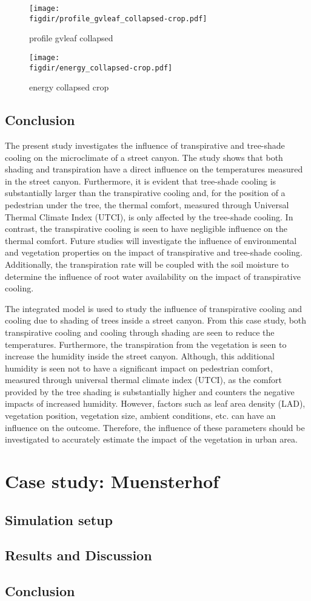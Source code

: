 \begin{figure}[p]
	\centering
	\texttt{[image: \\figdir/profile\_gvleaf\_collapsed-crop.pdf]}
	\caption{profile gvleaf collapsed}
	\label{fig:profile_gvleaf_collapsed}
\end{figure}

\begin{figure}[t]
	\centering
	\texttt{[image: \\figdir/energy\_collapsed-crop.pdf]}
	\caption{energy collapsed crop}
	\label{fig:energy_collapsed-crop}
\end{figure}


\subsection{Conclusion}

The present study investigates the influence of transpirative and tree-shade cooling on the microclimate of a street canyon. The study shows that both shading and transpiration have a direct influence on the temperatures measured in the street canyon. Furthermore, it is evident that tree-shade cooling is substantially larger than the transpirative cooling and, for the position of a pedestrian under the tree, the thermal comfort, measured through Universal Thermal Climate Index (UTCI), is only affected by the tree-shade cooling. In contrast, the transpirative cooling is seen to have negligible influence on the thermal comfort. Future studies will investigate the influence of environmental and vegetation properties on the impact of transpirative and tree-shade cooling. Additionally, the transpiration rate will be coupled with the soil moisture to determine the influence of root water availability on the impact of transpirative cooling.

The integrated model is used to study the influence of transpirative cooling and cooling due to shading of trees inside a street canyon. From this case study, both transpirative cooling and cooling through shading are seen to reduce the temperatures. Furthermore, the transpiration from the vegetation is seen to increase the humidity inside the street canyon. Although, this additional humidity is seen not to have a significant impact on pedestrian comfort, measured through universal thermal climate index (UTCI), as the comfort provided by the tree shading is substantially higher and counters the negative impacts of increased humidity. However, factors such as leaf area density (LAD), vegetation position, vegetation size, ambient conditions, etc. can have an influence on the outcome. Therefore, the influence of these parameters should be investigated to accurately estimate the impact of the vegetation in urban area.  

\section{Case study: Muensterhof}

\subsection{Simulation setup}

\subsection{Results and Discussion}

\subsection{Conclusion}
